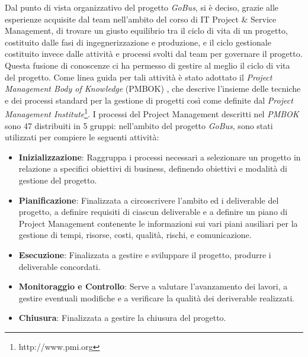 Dal punto di vista organizzativo del progetto \emph{GoBus}, si \`{e} deciso, grazie alle esperienze acquisite dal team nell\rq ambito del corso di IT Project \& Service Management, di trovare un giusto equilibrio tra il ciclo di vita di un progetto, costituito dalle fasi di ingegnerizzazione e produzione, e il ciclo gestionale costituito invece dalle attivit\`{a} e processi svolti dal team per governare il progetto. Questa fusione di conoscenze ci ha permesso di gestire al meglio il ciclo di vita del progetto. Come linea guida per tali attivit\`{a} \`{e} stato adottato il \emph{Project Management Body of Knowledge} (PMBOK) \cite{PMBOK}, che descrive l\rq insieme delle tecniche e dei processi standard per la gestione di progetti cos\`{i} come definite dal \emph{Project Management Institute}\footnote{http://www.pmi.org}. I processi del Project Management descritti nel \emph{PMBOK} \cite{PMBOK} sono 47 distribuiti in 5 gruppi: nell\rq ambito del progetto \emph{GoBus}, sono stati utilizzati per compiere le seguenti attivit\`{a}:

\begin{itemize}
	\item {\bf{Inizializzazione}}: Raggruppa i processi necessari a selezionare un progetto in relazione a specifici obiettivi di business, definendo obiettivi e modalit\`{a} di gestione del progetto.
	\item {\bf{Pianificazione}}: Finalizzata a circoscrivere l\rq ambito ed i deliverable del progetto, a definire requisiti di ciascun deliverable e a definire un piano di Project Management contenente le informazioni sui vari piani ausiliari per la gestione di tempi, risorse, costi, qualit\`{a}, rischi, e comunicazione.
	\item {\bf{Esecuzione}}: Finalizzata a gestire e sviluppare il progetto, produrre i deliverable concordati.
	\item  {\bf{Monitoraggio e Controllo}}: Serve a valutare l\rq avanzamento dei lavori, a gestire eventuali modifiche e a verificare la qualit\`{a} dei deriverable realizzati.
	\item {\bf{Chiusura}}: Finalizzata a gestire la chiusura del progetto.
\end{itemize}

